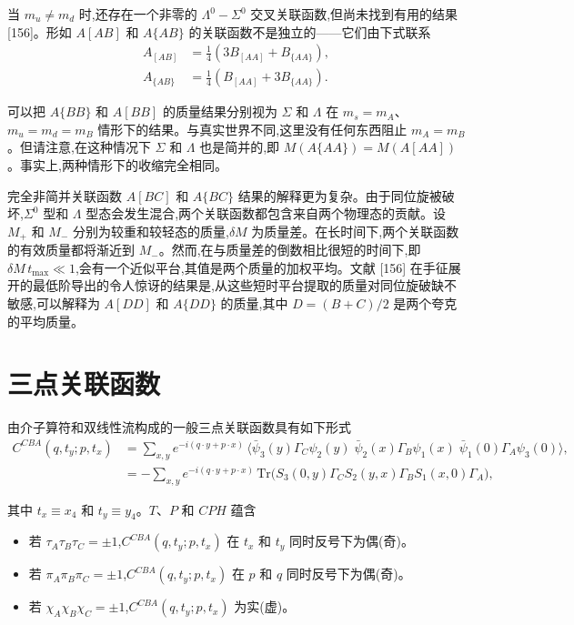 当 $m_u \neq m_d$ 时,还存在一个非零的 $\Lambda^0 - \Sigma^0$ 交叉关联函数,但尚未找到有用的结果 [156]。形如 $A[AB]$ 和 $A\{AB\}$ 的关联函数不是独立的——它们由下式联系
\begin{equation}
\begin{aligned}
A_{[AB]} &= \tfrac{1}{4}(3B_{[AA]} + B_{\{AA\}}),\\
A_{\{AB\}} &= \tfrac{1}{4}(B_{[AA]} + 3B_{\{AA\}}) .
\end{aligned}
\end{equation}

可以把 $A\{BB\}$ 和 $A[BB]$ 的质量结果分别视为 $\Sigma$ 和 $\Lambda$ 在 $m_s = m_A$、$m_u = m_d = m_B$ 情形下的结果。与真实世界不同,这里没有任何东西阻止 $m_A = m_B$。但请注意,在这种情况下 $\Sigma$ 和 $\Lambda$ 也是简并的,即 $M(A\{AA\}) = M(A[AA])$。事实上,两种情形下的收缩完全相同。

完全非简并关联函数 $A[BC]$ 和 $A\{BC\}$ 结果的解释更为复杂。由于同位旋被破坏,$\Sigma^0$ 型和 $\Lambda$ 型态会发生混合,两个关联函数都包含来自两个物理态的贡献。设 $M_+$ 和 $M_-$ 分别为较重和较轻态的质量,$\delta M$ 为质量差。在长时间下,两个关联函数的有效质量都将渐近到 $M_-$。然而,在与质量差的倒数相比很短的时间下,即 $\delta M\,t_{\max} \ll 1$,会有一个近似平台,其值是两个质量的加权平均。文献 [156] 在手征展开的最低阶导出的令人惊讶的结果是,从这些短时平台提取的质量对同位旋破缺不敏感,可以解释为 $A[DD]$ 和 $A\{DD\}$ 的质量,其中 $D = (B+C)/2$ 是两个夸克的平均质量。

\section{三点关联函数}

由介子算符和双线性流构成的一般三点关联函数具有如下形式
\begin{equation}
\begin{aligned}
C^{CBA}(q,t_y;p,t_x) &= \sum_{x,y} e^{-i(q\cdot y+p\cdot x)}\,
   \langle \bar{\psi}_3(y)\Gamma_C\psi_2(y)\;\bar{\psi}_2(x)\Gamma_B\psi_1(x)
   \;\bar{\psi}_1(0)\Gamma_A\psi_3(0)\rangle ,\\
&= -\sum_{x,y} e^{-i(q\cdot y+p\cdot x)}\,
   \mathrm{Tr}\big(S_3(0,y)\Gamma_C S_2(y,x)\Gamma_B S_1(x,0)\Gamma_A\big) ,
\end{aligned}
\end{equation}

其中 $t_x \equiv x_4$ 和 $t_y \equiv y_4$。$T$、$P$ 和 $CPH$ 蕴含
\begin{itemize}
\item 若 $\tau_A\tau_B\tau_C = \pm 1$,$C^{CBA}(q,t_y;p,t_x)$ 在 $t_x$ 和 $t_y$ 同时反号下为偶(奇)。
\item 若 $\pi_A\pi_B\pi_C = \pm 1$,$C^{CBA}(q,t_y;p,t_x)$ 在 $p$ 和 $q$ 同时反号下为偶(奇)。
\item 若 $\chi_A\chi_B\chi_C = \pm 1$,$C^{CBA}(q,t_y;p,t_x)$ 为实(虚)。
\end{itemize}

